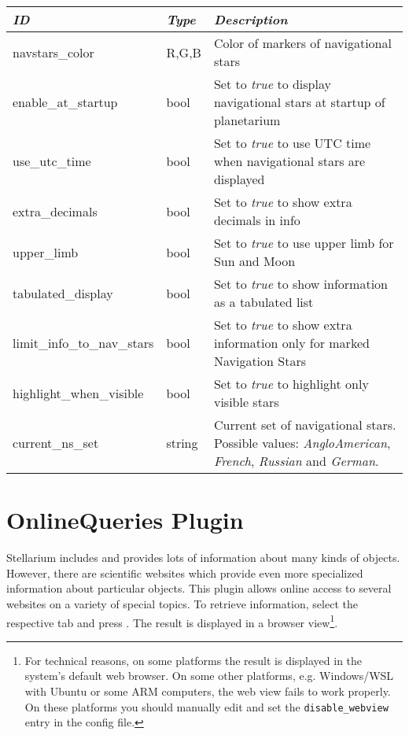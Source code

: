 \noindent%
\begin{tabularx}{\textwidth}{l|l|X}\toprule
\emph{ID}			& \emph{Type} 	& \emph{Description}\\\midrule
navstars\_color 	& R,G,B 		& Color of markers of navigational stars  \\
enable\_at\_startup & bool 		    & Set to \emph{true} to display navigational stars at startup of planetarium  \\
use\_utc\_time & bool & Set to \emph{true} to use UTC time when navigational stars are displayed \\
extra\_decimals & bool & Set to \emph{true} to show extra decimals in info \\
upper\_limb & bool & Set to \emph{true} to use upper limb for Sun and Moon \\
tabulated\_display & bool & Set to \emph{true} to show information as a tabulated list \\
limit\_info\_to\_nav\_stars & bool & Set to \emph{true} to show extra information only for marked Navigation Stars \\ 
highlight\_when\_visible & bool & Set to \emph{true} to highlight only visible stars \\
current\_ns\_set	& string		& Current set of navigational stars. Possible values: \emph{AngloAmerican}, \emph{French}, \emph{Russian} and \emph{German}. \\
\bottomrule
\end{tabularx}


\newpage
\section{OnlineQueries Plugin}
\label{sec:plugins:OnlineQueries}

Stellarium includes and provides lots of information about many kinds
of objects. However, there are scientific websites which provide even
more specialized information about particular objects. This plugin
 allows online access to several websites on a
variety of special topics. To retrieve information, select the
respective tab and press . The result is displayed in a
browser view\footnote{%
  For technical reasons, on some platforms the
  result is displayed in the system's default web browser.  On some
  other platforms, e.g. Windows/WSL with Ubuntu or some ARM computers, the
  web view fails to work properly.  On these platforms you should
  manually edit  and set the
  \texttt{disable\_webview} entry in the config file.}.

